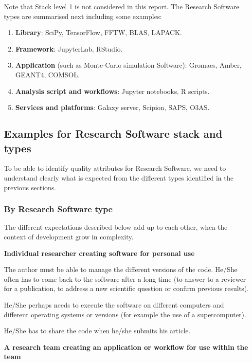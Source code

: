 Note that Stack level 1 is not considered in this report. The Research Software types are summarised next including some examples:

\begin{enumerate}
    \item \textbf{Library}: SciPy, TensorFlow, FFTW, BLAS, LAPACK.
    \item \textbf{Framework}: JupyterLab, RStudio.
    \item \textbf{Application} (such as Monte-Carlo simulation Software): Gromacs, Amber, GEANT4, COMSOL.
    \item \textbf{Analysis script and workflows}: Jupyter notebooks, R scripts.
    \item \textbf{Services and platforms}: Galaxy server, Scipion, SAPS, O3AS.
\end{enumerate}

\subsection{Examples for Research Software stack and types}

To be able to identify quality attributes for Research Software, we need to understand clearly what is expected from the different types identified in the previous sections.

\subsubsection{By Research Software type}

The different expectations described below add up to each other, when the context of development grow in complexity.

\textbf{Individual researcher creating software for personal use}

The author must be able to manage the different versions of the code. He/She often has to come back to the software after a long time (to answer to a reviewer for a publication, to address a new scientific question or confirm previous results).

He/She perhaps needs to execute the software on different computers and different operating systems or versions (for example the use of a supercomputer).

He/She has to share the code when he/she submits his article.

\textbf{A research team creating an application or workflow for use within the team}

